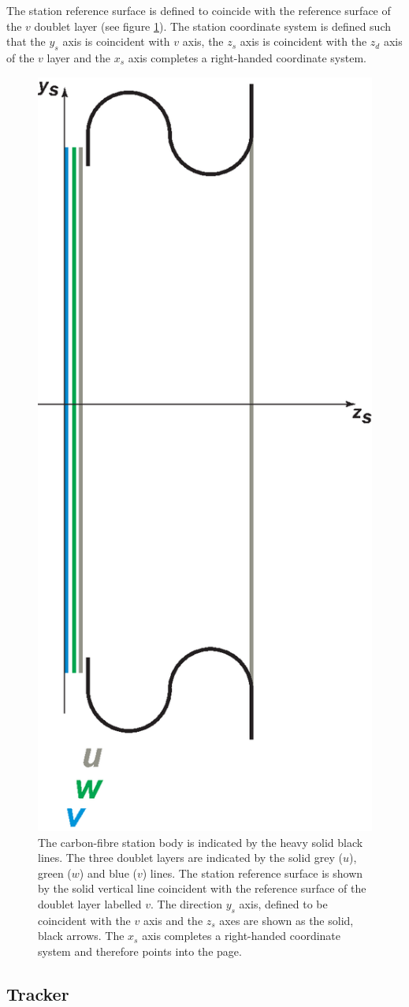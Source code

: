 The station reference surface is defined to coincide with the
reference surface of the $v$ doublet layer (see figure
\ref{Fig:StnRef&Coord}).
The station coordinate system is defined such that the $y_s$ axis is
coincident with $v$ axis, the $z_s$ axis is coincident with the $z_d$ axis
of the $v$ layer and the $x_s$ axis completes a right-handed coordinate
system.
\begin{figure}
  \begin{center}
    \includegraphics[width=0.22\linewidth]
      {03-Reference-surfaces-and-coordinate-systems/Figures/station.eps}
  \end{center}
  \caption{
    The carbon-fibre station body is indicated by the heavy solid
    black lines.
    The three doublet layers are indicated by the solid grey ($u$),
    green ($w$) and blue ($v$) lines.
    The station reference surface is shown by the solid vertical 
    line coincident with the reference surface of the doublet layer
    labelled $v$. 
    The direction $y_s$ axis, defined to be coincident with the $v$ axis
    and the $z_s$ axes are shown as the solid, black arrows.
    The $x_s$ axis completes a right-handed coordinate system and
    therefore points into the page.
  }
  \label{Fig:StnRef&Coord}
\end{figure}

\subsection{Tracker}
\label{SubSect:TrkrCoordStn}

